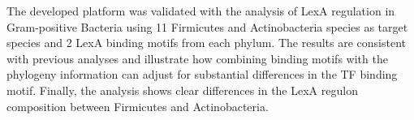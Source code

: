 The developed platform was validated with the analysis of LexA regulation in
Gram-positive Bacteria using 11 Firmicutes and Actinobacteria species as target
species and 2 LexA binding motifs from each phylum. The results are consistent
with previous analyses and illustrate how combining binding motifs with the
phylogeny information can adjust for substantial differences in the TF binding
motif. Finally, the analysis shows clear differences in the LexA regulon
composition between Firmicutes and Actinobacteria.
